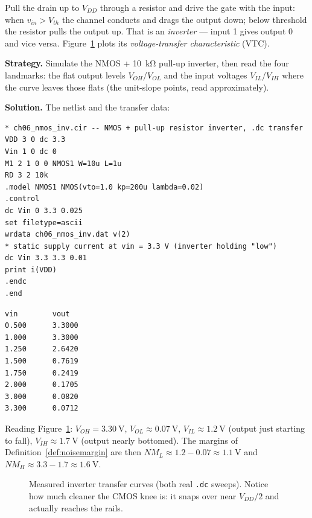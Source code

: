Pull the drain up to $V_{DD}$ through a resistor and drive the gate with the
input: when $v_{in} > V_{th}$ the channel conducts and drags the output
down; below threshold the resistor pulls the output up. That is an
\emph{inverter} — input 1 gives output 0 and vice
versa. Figure~\ref{fig:vtc} plots its \emph{voltage-transfer
characteristic} (VTC).

\begin{example}\label{ex:vtc}
\textbf{Strategy.} Simulate the NMOS + \qty{10}{\kilo\ohm} pull-up inverter,
then read the four landmarks: the flat output levels $V_{OH}$/$V_{OL}$ and
the input voltages $V_{IL}$/$V_{IH}$ where the curve leaves those flats
(the unit-slope points, read approximately).

\textbf{Solution.} The netlist and the transfer data:
\end{example}

\begin{lstlisting}[caption={\ttfamily code/ch06\_nmos\_inv.cir --- NMOS inverter with a resistive pull-up.},label=lst:nmosinv]
* ch06_nmos_inv.cir -- NMOS + pull-up resistor inverter, .dc transfer
VDD 3 0 dc 3.3
Vin 1 0 dc 0
M1 2 1 0 0 NMOS1 W=10u L=1u
RD 3 2 10k
.model NMOS1 NMOS(vto=1.0 kp=200u lambda=0.02)
.control
dc Vin 0 3.3 0.025
set filetype=ascii
wrdata ch06_nmos_inv.dat v(2)
* static supply current at vin = 3.3 V (inverter holding "low")
dc Vin 3.3 3.3 0.01
print i(VDD)
.endc
.end
\end{lstlisting}

\begin{lstlisting}[language={},caption={Rows of \texttt{ch06\_nmos\_inv.dat}, verbatim --- read $V_{OH}$, $V_{OL}$, and where the knee sits.},label=lst:nmosdata]
vin        vout
0.500      3.3000
1.000      3.3000
1.250      2.6420
1.500      0.7619
1.750      0.2419
2.000      0.1705
3.000      0.0820
3.300      0.0712
\end{lstlisting}

Reading Figure~\ref{fig:vtc}: $V_{OH}=\qty{3.30}{\volt}$,
$V_{OL}\approx\qty{0.07}{\volt}$, $V_{IL}\approx\qty{1.2}{\volt}$ (output
just starting to fall), $V_{IH}\approx\qty{1.7}{\volt}$ (output nearly
bottomed). The margins of Definition~\ref{def:noisemargin} are then
$N M_L \approx 1.2-0.07 \approx \qty{1.1}{\volt}$ and
$N M_H \approx 3.3-1.7 \approx \qty{1.6}{\volt}$.

\begin{figure}[htbp]
\centering

\caption{Measured inverter transfer curves (both real \texttt{.dc} sweeps).
Notice how much cleaner the CMOS knee is: it snaps over near $V_{DD}/2$ and
actually reaches the rails.}
\label{fig:vtc}
\end{figure}

